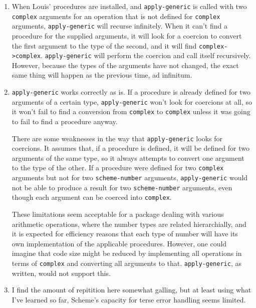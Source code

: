 \documentclass{article}
\begin{document}
\begin{enumerate}
    \item When Louis' procedures are installed, and \texttt{apply-generic} is
        called with two \texttt{complex} arguments for an operation that is not
        defined for \texttt{complex} arguments, \texttt{apply-generic} will
        recurse infinitely. When it can't find a procedure for the supplied
        arguments, it will look for a coercion to convert the first argument to
        the type of the second, and it will find \texttt{complex->complex}.
        \texttt{apply-generic} will perform the coercion and call itself
        recursively. However, because the types of the arguments have not
        changed, the exact same thing will happen as the previous time, ad
        infinitum.
    \item \texttt{apply-generic} works correctly as is. If a procedure is
        already defined for two arguments of a certain type,
        \texttt{apply-generic} won't look for coercions at all, so it won't
        fail to find a conversion from \texttt{complex} to \texttt{complex}
        unless it was going to fail to find a procedure anyway.

        There are some weaknesses in the way that \texttt{apply-generic} looks
        for coercions. It assumes that, if a procedure is defined, it will be
        defined for two arguments of the same type, so it always attempts to
        convert one argument to the type of the other. If a procedure were
        defined for two \texttt{complex} arguments but not for two
        \texttt{scheme-number} arguments, \texttt{apply-generic} would not be
        able to produce a result for two \texttt{scheme-number} arguments, even
        though each argument can be coerced into \texttt{complex}.

        These limitations seem acceptable for a package dealing with various
        arithmetic operations, where the number types are related hierarchially,
        and it is expected for efficiency reasons that each type of number will
        have its own implementation of the applicable procedures. However, one
        could imagine that code size might be reduced by implementing all
        operations in terms of \texttt{complex} and converting all arguments to
        that. \texttt{apply-generic}, as written, would not support this.
    \item 
        I find the amount of repitition here somewhat galling, but at least
        using what I've learned so far, Scheme's capacity for terse error
        handling seems limited.
\end{enumerate}
\end{document}
